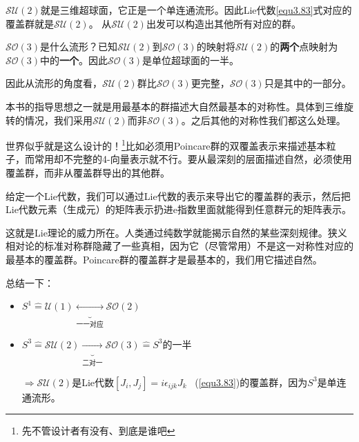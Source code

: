 $\mathcal{SU}(2)$就是三维超球面，它正是一个单连通流形。因此Lie代数\ref{equ3.83}式对应的覆盖群就是$\mathcal{SU}(2)$。 从$\mathcal{SU}(2)$出发可以构造出其他所有对应的群。

$\mathcal{SO}(3)$是什么流形？已知$\mathcal{SU}(2)$到$\mathcal{SO}(3)$的映射将$\mathcal{SU}(2)$的{\bf 两个}点映射为$\mathcal{SO}(3)$中的{\bf 一个}。因此$\mathcal{SO}(3)$是单位超球面的一半。


因此从流形的角度看，$\mathcal{SU}(2)$群比$\mathcal{SO}(3)$更完整，$\mathcal{SO}(3)$只是其中的一部分。

本书的指导思想之一就是用最基本的群描述大自然最基本的对称性。具体到三维旋转的情况，我们采用$\mathcal{SU}(2)$而非$\mathcal{SO}(3)$。之后其他的对称性我们都这么处理。

世界似乎就是这么设计的！\footnote{先不管设计者有没有、到底是谁吧}比如必须用Poincare群的双覆盖表示来描述基本粒子，而常用却不完整的4-向量表示就不行。要从最深刻的层面描述自然，必须使用覆盖群，而非从覆盖群导出的其他群。

给定一个Lie代数，我们可以通过Lie代数的表示来导出它的覆盖群的表示，然后把Lie代数元素（生成元）的矩阵表示扔进$\mathrm{e}$指数里面就能得到任意群元的矩阵表示。

这就是Lie理论的威力所在。人类通过纯数学就能揭示自然的某些深刻规律。狭义相对论的标准对称群隐藏了一些真相，因为它（尽管常用）不是这一对称性对应的最基本的覆盖群。Poincare群的覆盖群才是最基本的，我们用它描述自然。

总结一下：

\begin{itemize}
	\item $S^1 \hat{=} \mathcal{U}(1) \underbrace{\longleftrightarrow}_{\text{一一对应}} \mathcal{SO}(2)$
	\item $S^3 \hat{=} \mathcal{SU}(2) \underbrace{\longrightarrow}_{\text{二对一}} \mathcal{SO}(3) \hat{=} S^3$的一半

		$\Rightarrow \mathcal{SU}(2)$是Lie代数$[J_i, J_j] = i\epsilon_{ijk} J_k$ \, (\ref{equ3.83})的覆盖群，因为$S^3$是单连通流形。
\end{itemize}

